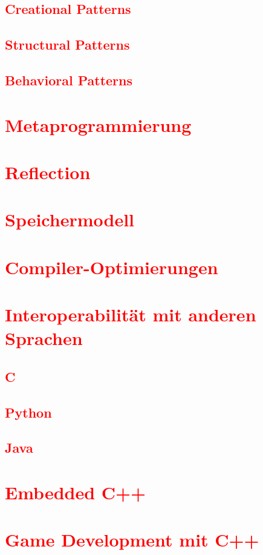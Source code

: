 \subsection{\textcolor{red}{Creational Patterns}}\label{sec:creational-patterns}
\subsection{\textcolor{red}{Structural Patterns}}\label{sec:structural-patterns}
\subsection{\textcolor{red}{Behavioral Patterns}}\label{sec:behavioral-patterns}
\section{\textcolor{red}{Metaprogrammierung}}\label{sec:metaprogramming}
\section{\textcolor{red}{Reflection}}\label{sec:reflection}
\section{\textcolor{red}{Speichermodell}}\label{sec:memory-model}
\section{\textcolor{red}{Compiler-Optimierungen}}\label{sec:compiler-optimizations}
\section{\textcolor{red}{Interoperabilität mit anderen Sprachen}}\label{sec:interoperability}
\subsection{\textcolor{red}{C}}\label{sec:interop-c}
\subsection{\textcolor{red}{Python}}\label{sec:interop-python}
\subsection{\textcolor{red}{Java}}\label{sec:interop-java}
\section{\textcolor{red}{Embedded C++}}\label{sec:embedded-cpp}
\section{\textcolor{red}{Game Development mit C++}}\label{sec:game-development}
